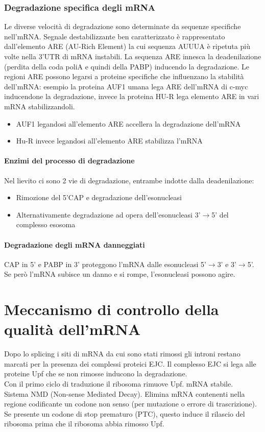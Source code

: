 \documentclass{article}
\begin{document}
\subsubsection{Degradazione specifica degli mRNA}
Le diverse velocità di degradazione sono determinate da sequenze specifiche nell'mRNA. Segnale destabilizzante ben caratterizzato è rappresentato dall'elemento ARE (AU-Rich Element) la cui sequenza AUUUA è
ripetuta più volte nella 3'UTR di mRNA instabili. La sequenza ARE innesca la deadenilazione (perdita della coda poliA e quindi della PABP) inducendo la degradazione.
Le regioni ARE possono legarsi a proteine specifiche che influenzano la stabilità dell'mRNA: esempio la proteina AUF1 umana lega ARE dell'mRNA di c-myc inducendone la degradazione, invece la proteina HU-R lega elemento ARE in vari mRNA stabilizzandoli.
\begin{itemize}
    \item AUF1 legandosi all'elemento ARE accellera la degradazione dell'mRNA
    \item Hu-R invece legandosi all'elemento ARE stabilizza l'mRNA
\end{itemize}
\paragraph{Enzimi del processo di degradazione}
Nel lievito ci sono 2 vie di degradazione, entrambe indotte dalla deadenilazione:
\begin{itemize}
    \item Rimozione del 5'CAP e degradazione dell'esonucleasi
    \item Alternativamente degradazione ad opera dell'esonucleasi 3'$\rightarrow$5' del complesso esosoma
\end{itemize}
\paragraph{Degradazione degli mRNA danneggiati}
CAP in 5' e PABP in 3' proteggono l'mRNA dalle esonucleasi 5'$\rightarrow$3' e 3'$\rightarrow$5'. Se però l'mRNA subisce un 
danno e si rompe, l'esonucleasi possono agire.
\section{Meccanismo di controllo della qualità dell'mRNA}
Dopo lo splicing i siti di mRNA da cui sono stati rimossi gli introni restano marcati per la
presenza dei complessi proteici EJC. Il complesso EJC si lega alle proteine Upf che se non rimosse
inducono la degradazione.\\Con il primo ciclo di traduzione il ribosoma rimuove Upf. mRNA stabile.\\
Sistema NMD (Non-sense Mediated Decay). Elimina mRNA contenenti nella regione codificante un codone non senso (per mutazione o errore di trascrizione).
Se presente un codone di stop prematuro (PTC), questo induce il rilascio del ribosoma prima che il ribosoma abbia rimosso Upf.
\end{document}
